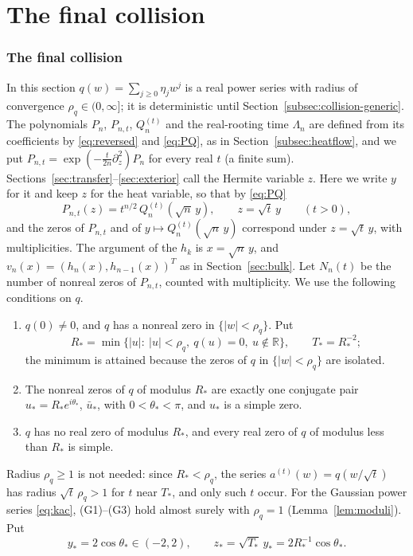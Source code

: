 \documentclass[11pt]{amsart}
\theoremstyle{definition}
\theoremstyle{remark}
\numberwithin{equation}{section}
\newcommand{\R}{\mathbb{R}}
\begin{document}
\clearpage
\part{The final collision}

\section{The final collision}\label{sec:collision}

In this section $q(w)=\sum_{j\ge0}\eta_jw^j$ is a real power series with radius of convergence $\rho_q\in(0,\infty]$; it is deterministic until Section~\ref{subsec:collision-generic}. The polynomials $P_n$, $P_{n,t}$, $Q_n^{(t)}$ and the real-rooting time $\Lambda_n$ are defined from its coefficients by \eqref{eq:reversed} and \eqref{eq:PQ}, as in Section~\ref{subsec:heatflow}, and we put $P_{n,t}=\exp(-\frac t{2n}\partial_z^2)P_n$ for every real $t$ (a finite sum). Sections~\ref{sec:transfer}--\ref{sec:exterior} call the Hermite variable $z$. Here we write $y$ for it and keep $z$ for the heat variable, so that by \eqref{eq:PQ}
\begin{equation}\label{eq:collision-S1}
P_{n,t}(z)=t^{n/2}\,Q_n^{(t)}(\sqrt n\,y),\qquad z=\sqrt t\,y\qquad(t>0),
\end{equation}
and the zeros of $P_{n,t}$ and of $y\mapsto Q_n^{(t)}(\sqrt n\,y)$ correspond under $z=\sqrt t\,y$, with multiplicities. The argument of the $h_k$ is $x=\sqrt n\,y$, and $v_n(x)=(h_n(x),h_{n-1}(x))^T$ as in Section~\ref{sec:bulk}. Let $N_n(t)$ be the number of nonreal zeros of $P_{n,t}$, counted with multiplicity. We use the following conditions on $q$.
\begin{enumerate}
\item[(G1)] $q(0)\ne0$, and $q$ has a nonreal zero in $\{|w|<\rho_q\}$. Put
\[
R_*=\min\{|u|:\ |u|<\rho_q,\ q(u)=0,\ u\notin\R\},\qquad T_*=R_*^{-2};
\]
the minimum is attained because the zeros of $q$ in $\{|w|<\rho_q\}$ are isolated.
\item[(G2)] The nonreal zeros of $q$ of modulus $R_*$ are exactly one conjugate pair $u_*=R_*e^{i\theta_*}$, $\bar u_*$, with $0<\theta_*<\pi$, and $u_*$ is a simple zero.
\item[(G3)] $q$ has no real zero of modulus $R_*$, and every real zero of $q$ of modulus less than $R_*$ is simple.
\end{enumerate}
Radius $\rho_q\ge1$ is not needed: since $R_*<\rho_q$, the series $a^{(t)}(w)=q(w/\sqrt t)$ has radius $\sqrt t\,\rho_q>1$ for $t$ near $T_*$, and only such $t$ occur. For the Gaussian power series \eqref{eq:kac}, (G1)--(G3) hold almost surely with $\rho_q=1$ (Lemma~\ref{lem:moduli}). Put
\[
y_*=2\cos\theta_*\in(-2,2),\qquad z_*=\sqrt{T_*}\,y_*=2R_*^{-1}\cos\theta_* .
\]
\end{document}
